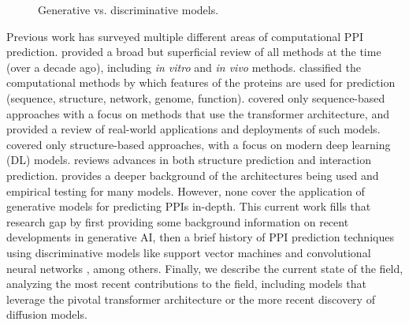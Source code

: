 \documentclass{article}
\begin{document}
\begin{figure}
{
  }

\caption{Generative vs. discriminative models.}
\label{visual-abstract}
\end{figure}

Previous work has surveyed multiple different areas of computational PPI prediction. \citet{rao_protein-protein_2014} provided a broad but superficial review of all methods at the time (over a decade ago), including \textit{in vitro} and \textit{in vivo} methods. \citet{ding_computational_2018} classified the computational methods by which features of the proteins are used for prediction (sequence, structure, network, genome, function). \citet{charih_sequence-based_2025} covered only sequence-based approaches with a focus on methods that use the transformer architecture, and provided a review of real-world applications and deployments of such models. \citet{kiouri_structure-based_2025} covered only structure-based approaches, with a focus on modern deep learning (DL) models. \citet{zhang_revolutionizing_2024} reviews advances in both structure prediction and interaction prediction. \citet{taha_protein-protein_2025} provides a deeper background of the architectures being used and empirical testing for many models. However, none cover the application of generative models for predicting PPIs in-depth. This current work fills that research gap by first providing some background information on recent developments in generative AI, then a brief history of PPI prediction techniques using discriminative models like support vector machines \citep[SVM;][]{cortes_support-vector_1995} and convolutional neural networks \citep[CNN;][]{lecun_backpropagation_1989}, among others. Finally, we describe the current state of the field, analyzing the most recent contributions to the field, including models that leverage the pivotal transformer architecture or the more recent discovery of diffusion models.
\end{document}
